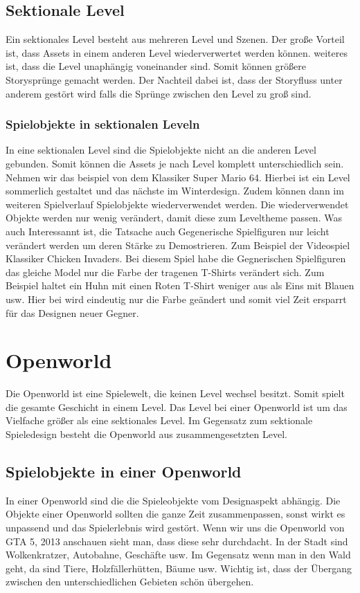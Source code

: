 \subsection {Sektionale Level}
Ein sektionales Level besteht aus mehreren Level und Szenen. Der große Vorteil ist, dass Assets in einem anderen Level wiederverwertet werden können. weiteres ist, dass die Level unaphängig voneinander sind. Somit können größere Storysprünge gemacht werden. Der Nachteil dabei ist, dass der Storyfluss unter anderem gestört wird falls die Sprünge zwischen den Level zu groß sind. 

\subsubsection{Spielobjekte in sektionalen Leveln}
In eine sektionalen Level sind die Spielobjekte nicht an die anderen Level gebunden. Somit können die Assets je nach Level komplett unterschiedlich sein. Nehmen wir das beispiel von dem Klassiker Super Mario 64. Hierbei ist ein Level sommerlich gestaltet und das nächste im Winterdesign. Zudem können dann im weiteren Spielverlauf Spielobjekte wiederverwendet werden. Die wiederverwendet Objekte werden nur wenig verändert, damit diese zum Leveltheme passen. Was auch Interessannt ist, die Tatsache auch Gegenerische Spielfiguren nur leicht verändert werden um deren Stärke zu Demostrieren. Zum Beispiel der Videospiel Klassiker Chicken Invaders. Bei diesem Spiel habe die Gegnerischen Spielfiguren das gleiche Model nur die Farbe der tragenen T-Shirts verändert sich. Zum Beispiel haltet ein Huhn mit einen Roten T-Shirt weniger aus als Eins mit Blauen usw. Hier bei wird eindeutig nur die Farbe geändert und somit viel Zeit ersparrt für das Designen neuer Gegner. 

\section{Openworld}
Die Openworld ist eine Spielewelt, die keinen Level wechsel besitzt. Somit spielt die gesamte Geschicht in einem Level. Das Level bei einer Openworld ist um das Vielfache größer als eine sektionales Level. Im Gegensatz zum sektionale Spieledesign besteht die Openworld aus zusammengesetzten Level.   


\subsection{Spielobjekte in einer Openworld}
In einer Openworld sind die die Spieleobjekte vom Designaspekt abhängig. Die Objekte einer Openworld sollten die ganze Zeit zusammenpassen, sonst wirkt es unpassend und das Spielerlebnis wird gestört. Wenn wir uns die Openworld von GTA 5, 2013 anschauen sieht man, dass diese sehr durchdacht. In der Stadt sind Wolkenkratzer, Autobahne, Geschäfte usw. Im Gegensatz wenn man in den Wald geht, da sind Tiere, Holzfällerhütten, Bäume usw. Wichtig ist, dass der Übergang zwischen den unterschiedlichen Gebieten schön übergehen. 

